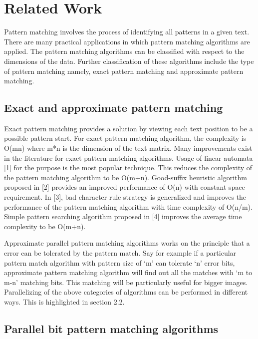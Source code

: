 \documentclass[graybox]{svmult}
\begin{document}
\section{Related Work}
\label{sec:2}
Pattern matching involves the process of identifying all patterns in a given text. There are many practical applications in which pattern matching algorithms are applied. The pattern matching algorithms can be classified with respect to the dimensions of the data. Further classification of these algorithms include the type of pattern matching namely, exact pattern
matching and approximate pattern matching.

\subsection{Exact and approximate pattern matching}
\label{subsec:2}
Exact pattern matching provides a solution by viewing each text position to be a possible pattern start. For exact pattern matching algorithm, the complexity is O(mn) where m*n is the dimension of the text matrix. Many improvements exist in the literature for exact pattern matching algorithms. Usage of linear automata [1] for the purpose is the most popular technique. This reduces the complexity of the pattern matching algorithm to be O(m+n). Good-suffix heuristic algorithm proposed in [2] provides an improved performance of O(n) with constant space requirement. In [3], bad character rule strategy is generalized and improves the performance of the pattern matching algorithm with time complexity of O(n/m). Simple pattern searching algorithm proposed in [4] improves the average time complexity to be O(m+n).

Approximate parallel pattern matching algorithms works on the principle that a error can be tolerated by the pattern match. Say for example if a particular pattern match algorithm with pattern size of ‘m’ can tolerate ‘n’ error bits, approximate pattern matching algorithm will find out all the matches with ‘m to m-n’ matching bits. This matching will be particularly useful for bigger images. Parallelizing of the above categories of algorithms can be performed in different ways. This is highlighted in section 2.2.

\subsection{Parallel bit pattern matching algorithms}
\label{subsec:2}
\end{document}
